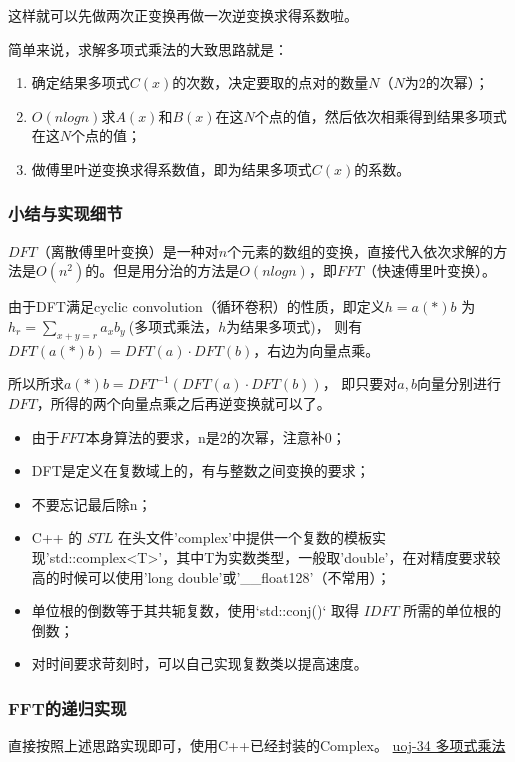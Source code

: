 这样就可以先做两次正变换再做一次逆变换求得系数啦。

简单来说，求解多项式乘法的大致思路就是：

\begin{enumerate}
\item 确定结果多项式$C(x)$的次数，决定要取的点对的数量$N$（$N$为2的次幂）；
\item $O(nlogn)$求$A(x)$和$B(x)$在这$N$个点的值，然后依次相乘得到结果多项式在这$N$个点的值；  
\item 做傅里叶逆变换求得系数值，即为结果多项式$C(x)$的系数。
\end{enumerate}

\subsubsection{小结与实现细节}
$DFT$（离散傅里叶变换）是一种对$n$个元素的数组的变换，直接代入依次求解的方法是$O(n^2)$的。但是用分治的方法是$O(nlogn)$，即$FFT$（快速傅里叶变换）。

由于DFT满足{\heiti cyclic convolution（循环卷积）}的性质，即定义$h=a (*) b$  为$h_r=\sum_{x+y=r}a_xb_y\ $(多项式乘法，$h$为结果多项式)，
则有$DFT(a (*) b)=DFT(a)\cdot DFT(b)$，右边为向量点乘。

所以所求$a (*) b=DFT^{-1}(DFT(a)\cdot DFT(b))$，
即只要对$a,b$向量分别进行$DFT$，所得的两个向量点乘之后再逆变换就可以了。

\begin{note}
\begin{itemize}
\item 由于$FFT$本身算法的要求，n是2的次幂，注意补0；
\item DFT是定义在复数域上的，有与整数之间变换的要求；
\item 不要忘记最后除n；
\item C++ 的 $STL$ 在头文件'complex'中提供一个复数的模板实现'std::complex<T>'，其中T为实数类型，一般取'double'，在对精度要求较高的时候可以使用'long double'或'\_\_float128'（不常用）；
\item 单位根的倒数等于其共轭复数，使用`std::conj()` 取得 $IDFT$ 所需的单位根的倒数；
\item 对时间要求苛刻时，可以自己实现复数类以提高速度。
\end{itemize}
\end{note}


\subsubsection{FFT的递归实现}
直接按照上述思路实现即可，使用C++已经封装的Complex。
\href{http://uoj.ac/problem/34}{uoj-34 多项式乘法}

